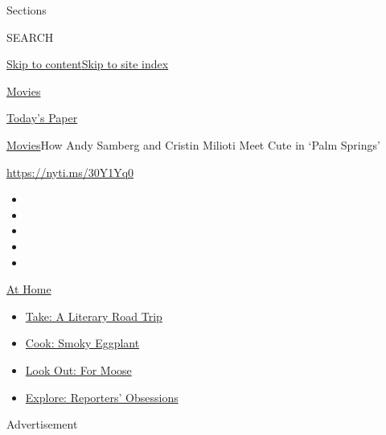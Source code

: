 Sections

SEARCH

\protect\hyperlink{site-content}{Skip to
content}\protect\hyperlink{site-index}{Skip to site index}

\href{https://www.nytimes.com/section/movies}{Movies}

\href{https://myaccount.nytimes.com/auth/login?response_type=cookie\&client_id=vi}{}

\href{https://www.nytimes.com/section/todayspaper}{Today's Paper}

\href{/section/movies}{Movies}\textbar{}How Andy Samberg and Cristin
Milioti Meet Cute in `Palm Springs'

\url{https://nyti.ms/30Y1Yq0}

\begin{itemize}
\item
\item
\item
\item
\item
\end{itemize}

\href{https://www.nytimes.com/spotlight/at-home?action=click\&pgtype=Article\&state=default\&region=TOP_BANNER\&context=at_home_menu}{At
Home}

\begin{itemize}
\tightlist
\item
  \href{https://www.nytimes.com/2020/07/28/books/time-for-a-literary-road-trip.html?action=click\&pgtype=Article\&state=default\&region=TOP_BANNER\&context=at_home_menu}{Take:
  A Literary Road Trip}
\item
  \href{https://www.nytimes.com/2020/07/29/magazine/bored-with-your-home-cooking-some-smoky-eggplant-will-fix-that.html?action=click\&pgtype=Article\&state=default\&region=TOP_BANNER\&context=at_home_menu}{Cook:
  Smoky Eggplant}
\item
  \href{https://www.nytimes.com/2020/07/27/travel/moose-michigan-isle-royale.html?action=click\&pgtype=Article\&state=default\&region=TOP_BANNER\&context=at_home_menu}{Look
  Out: For Moose}
\item
  \href{https://www.nytimes.com/interactive/2020/at-home/even-more-reporters-editors-diaries-lists-recommendations.html?action=click\&pgtype=Article\&state=default\&region=TOP_BANNER\&context=at_home_menu}{Explore:
  Reporters' Obsessions}
\end{itemize}

Advertisement

